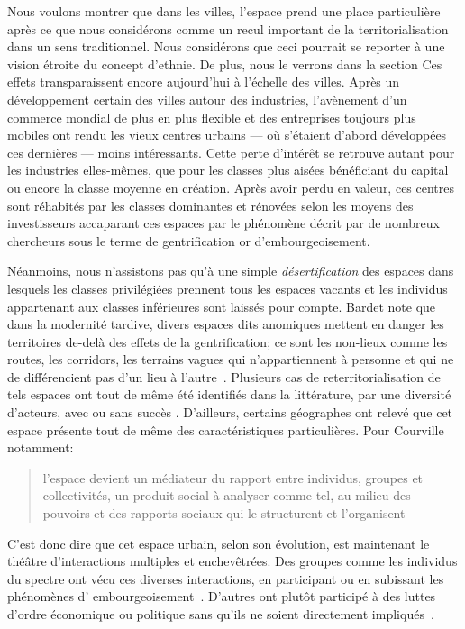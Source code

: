 Nous voulons montrer que dans les villes, l'espace prend une place particulière après ce que nous considérons comme un recul important de la territorialisation dans un sens traditionnel.
Nous considérons que ceci pourrait se reporter à une vision étroite du concept d'ethnie.
De plus, nous le verrons dans la section 
Ces effets transparaissent encore aujourd'hui à l'échelle des villes.
Après un développement certain des villes autour des industries, l'avènement d'un commerce mondial de plus en plus flexible et des entreprises toujours plus mobiles ont rendu les vieux centres urbains --- où s'étaient d'abord développées ces dernières --- moins intéressants.
Cette perte d'intérêt se retrouve autant pour les industries elles-mêmes, que pour les classes plus aisées bénéficiant du capital ou encore la classe moyenne en création.
Après avoir perdu en valeur, ces centres sont réhabités par les classes dominantes et rénovées selon les moyens des investisseurs accaparant ces espaces par le phénomène décrit par de nombreux chercheurs sous le terme de gentrification or d'embourgeoisement.

Néanmoins, nous n'assistons pas qu'à une simple \emph{désertification} des espaces dans lesquels les classes privilégiées prennent tous les espaces vacants et les individus appartenant aux classes inférieures sont laissés pour compte.
Bardet note que dans la modernité tardive, divers espaces dits anomiques mettent en danger les territoires de-delà des effets de la gentrification;  ce sont les non-lieux comme les routes, les corridors, les terrains vagues qui n'appartiennent à personne et qui ne de différencient pas d'un lieu à l'autre~\citep[22--23]{Bardet2012}.
Plusieurs cas de reterritorialisation de tels espaces ont tout de même été identifiés dans la littérature, par une diversité d'acteurs, avec ou sans succès \citep{Hatvany2005}.
D'ailleurs, certains géographes ont relevé que cet espace présente tout de même des caractéristiques particulières.
Pour Courville notamment: \blockquote[{\cite[41]{Courville1991}}][.]{l'espace devient un médiateur du rapport entre individus, groupes et collectivités, un produit social à analyser comme tel, au milieu des pouvoirs et des rapports sociaux qui le structurent et l'organisent}.

C'est donc dire que cet espace urbain, selon son évolution, est maintenant le théâtre d'interactions multiples et enchevêtrées.
Des groupes comme les individus du spectre \lgbt{} ont vécu ces diverses interactions, en participant ou en subissant les phénomènes d’ embourgeoisement~\autocite{Podmore2001,Giraud2014,Hogan2005}.
D'autres ont plutôt participé à des luttes d'ordre économique ou politique sans qu'ils ne soient directement impliqués~\autocite{Kelliher2014}.

